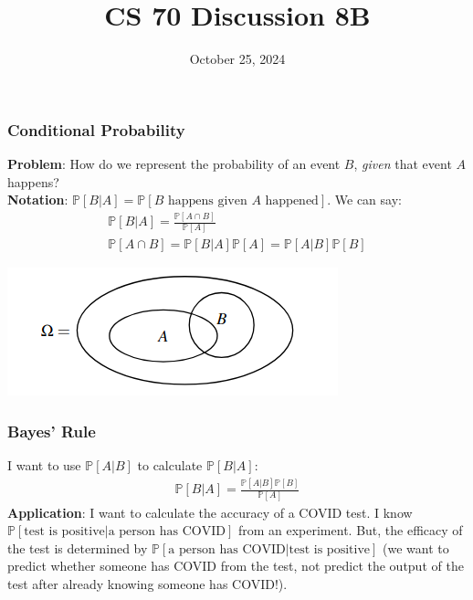 \documentclass{beamer}
\title{CS 70 Discussion 8B}
\date{October 25, 2024}
\begin{document}
\frame{\titlepage}

\begin{frame}
    \frametitle{Conditional Probability}
    {\bf Problem}: How do we represent the probability of an event $B$, {\it given} that event $A$ happens?\\
    {\bf Notation}: $\mathbb{P}[B|A]=\mathbb{P}[B\text{ happens given }A\text{ happened}]$. We can say:
    \begin{gather*}
        \mathbb{P}[B|A]=\frac{\mathbb{P}[A\cap B]}{\mathbb{P}[A]}\\
        \mathbb{P}[A\cap B]=\mathbb{P}[B|A]\mathbb{P}[A]=\mathbb{P}[A|B]\mathbb{P}[B]
    \end{gather*}
    \begin{center}
        \includegraphics[scale=0.5]{Images/conditional-probability.png}
    \end{center}
\end{frame}

\begin{frame}
    \frametitle{Bayes' Rule}
    I want to use $\mathbb{P}[A|B]$ to calculate $\mathbb{P}[B|A]$:
    \begin{gather*}
        \mathbb{P}[B|A]=\frac{\mathbb{P}[A|B]\mathbb{P}[B]}{\mathbb{P}[A]}
    \end{gather*}
    {\bf Application}: I want to calculate the accuracy of a COVID test. I know $\mathbb{P}[\text{test is positive}|\text{a person has COVID}]$ from an experiment. But, the efficacy of the test is determined by $\mathbb{P}[\text{a person has COVID}|\text{test is positive}]$ (we want to predict whether someone has COVID from the test, not predict the output of the test after already knowing someone has COVID!).
\end{frame}
\end{document}
